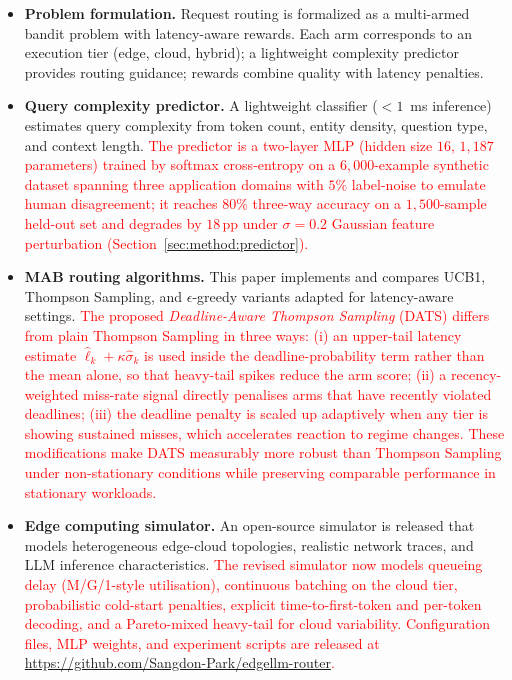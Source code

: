 \documentclass[final,3p,twocolumn,authoryear]{elsarticle}
\newcommand{\rev}[1]{\textcolor{red}{#1}}
\theoremstyle{plain}
\theoremstyle{definition}
\begin{document}
\begin{itemize}
  \item \textbf{Problem formulation.}
        Request routing is formalized as a multi-armed bandit problem with latency-aware rewards.
        Each arm corresponds to an execution tier (edge, cloud, hybrid); a lightweight complexity predictor provides routing guidance; rewards combine quality with latency penalties.

  \item \textbf{Query complexity predictor.}
        A lightweight classifier ($<1$~ms inference) estimates query complexity from token count, entity density, question type, and context length.
        \rev{The predictor is a two-layer MLP (hidden size $16$, $1{,}187$ parameters) trained by softmax cross-entropy on a $6{,}000$-example synthetic dataset spanning three application domains with $5\%$ label-noise to emulate human disagreement; it reaches $80\%$ three-way accuracy on a $1{,}500$-sample held-out set and degrades by $18$\,pp under $\sigma{=}0.2$ Gaussian feature perturbation (Section~\ref{sec:method:predictor}).}

  \item \textbf{MAB routing algorithms.}
        This paper implements and compares UCB1, Thompson Sampling, and $\epsilon$-greedy variants adapted for latency-aware settings.
        \rev{The proposed \emph{Deadline-Aware Thompson Sampling} (DATS) differs from plain Thompson Sampling in three ways: (i) an upper-tail latency estimate $\hat{\ell}_k + \kappa \hat{\sigma}_k$ is used inside the deadline-probability term rather than the mean alone, so that heavy-tail spikes reduce the arm score; (ii) a recency-weighted miss-rate signal directly penalises arms that have recently violated deadlines; (iii) the deadline penalty is scaled up adaptively when any tier is showing sustained misses, which accelerates reaction to regime changes. These modifications make DATS measurably more robust than Thompson Sampling under non-stationary conditions while preserving comparable performance in stationary workloads.}

  \item \textbf{Edge computing simulator.}
        An open-source simulator is released that models heterogeneous edge-cloud topologies, realistic network traces, and LLM inference characteristics.
        \rev{The revised simulator now models queueing delay (M/G/1-style utilisation), continuous batching on the cloud tier, probabilistic cold-start penalties, explicit time-to-first-token and per-token decoding, and a Pareto-mixed heavy-tail for cloud variability. Configuration files, MLP weights, and experiment scripts are released at \url{https://github.com/Sangdon-Park/edgellm-router}.}


\end{itemize}
\end{document}
